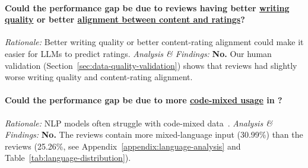 
\begin{comment}
    

Relaxing strict semantic alignment between paired text items inevitably introduces confounding variables.
This trade-off is worth exploring because it enables researchers to compare model behaviors across language varieties in new ways. 
This section examines a few potential confounding variables.
\end{comment}

\paragraph{Could the performance gap be due to \cnChinese reviews having better \ul{writing quality} or better \ul{alignment between content and ratings}?}
\textit{Rationale:} Better writing quality or better content-rating alignment could make it easier for LLMs to predict ratings.
\textit{Analysis \& Findings:} \textbf{No.} 
Our human validation (Section~\ref{sec:data-quality-validation}) shows that \cnChinese reviews had slightly worse writing quality and content-rating alignment. 









\paragraph{Could the performance gap be due to more \ul{code-mixed usage} in \twChinese?}
\textit{Rationale:} NLP models often struggle with code-mixed data~\cite{zhang-etal-2023-multilingual, ochieng2024beyond}. 
\textit{Analysis \& Findings:}
\textbf{No.}
The \cnChinese reviews contain more mixed-language input (30.99\%) than the \twChinese reviews (25.26\%, see Appendix~\ref{appendix:language-analysis} and Table~\ref{tab:language-distribution}).

